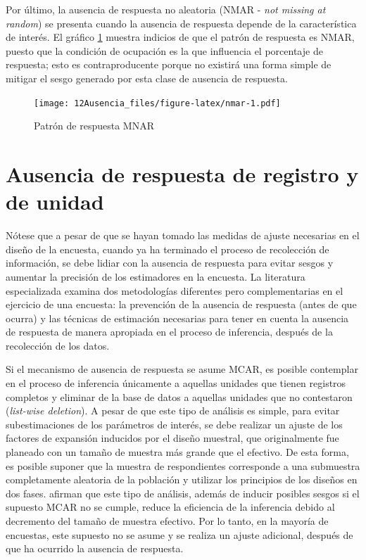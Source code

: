 \documentclass[
  12pt,
]{book}
\begin{document}
Por último, la ausencia de respuesta no aleatoria (NMAR - \emph{not missing at random}) se presenta cuando la ausencia de respuesta depende de la característica de interés. El gráfico \ref{fig:nmar} muestra indicios de que el patrón de respuesta es NMAR, puesto que la condición de ocupación es la que influencia el porcentaje de respuesta; esto es contraproducente porque no existirá una forma simple de mitigar el sesgo generado por esta clase de ausencia de respuesta.

\begin{figure}
\centering
\texttt{[image: 12Ausencia\_files/figure-latex/nmar-1.pdf]}
\caption{\label{fig:nmar}Patrón de respuesta MNAR}
\end{figure}

\hypertarget{ausencia-de-respuesta-de-registro-y-de-unidad}{%
\section{Ausencia de respuesta de registro y de unidad}\label{ausencia-de-respuesta-de-registro-y-de-unidad}}

Nótese que a pesar de que se hayan tomado las medidas de ajuste necesarias en el diseño de la encuesta, cuando ya ha terminado el proceso de recolección de información, se debe lidiar con la ausencia de respuesta para evitar sesgos y aumentar la precisión de los estimadores en la encuesta. La literatura especializada examina dos metodologías diferentes pero complementarias en el ejercicio de una encuesta: la prevención de la ausencia de respuesta (antes de que ocurra) y las técnicas de estimación necesarias para tener en cuenta la ausencia de respuesta de manera apropiada en el proceso de inferencia, después de la recolección de los datos.

Si el mecanismo de ausencia de respuesta se asume MCAR, es posible contemplar en el proceso de inferencia únicamente a aquellas unidades que tienen registros completos y eliminar de la base de datos a aquellas unidades que no contestaron (\emph{list-wise deletion}). A pesar de que este tipo de análisis es simple, para evitar subestimaciones de los parámetros de interés, se debe realizar un ajuste de los factores de expansión inducidos por el diseño muestral, que originalmente fue planeado con un tamaño de muestra más grande que el efectivo. De esta forma, es posible suponer que la muestra de respondientes corresponde a una submuestra completamente aleatoria de la población y utilizar los principios de los diseños en dos fases. \citet[capítulo 11]{Heeringa_West_Berglund_2010} afirman que este tipo de análisis, además de inducir posibles sesgos si el supuesto MCAR no se cumple, reduce la eficiencia de la inferencia debido al decremento del tamaño de muestra efectivo. Por lo tanto, en la mayoría de encuestas, este supuesto no se asume y se realiza un ajuste adicional, después de que ha ocurrido la ausencia de respuesta.
\end{document}
